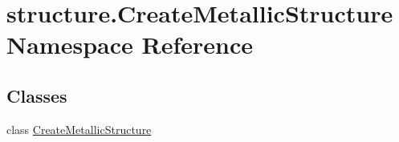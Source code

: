 \hypertarget{namespacestructure_1_1_create_metallic_structure}{\section{structure.\-Create\-Metallic\-Structure Namespace Reference}
\label{namespacestructure_1_1_create_metallic_structure}
}
\subsection*{Classes}
\begin{DoxyCompactItemize}
\item 
class \hyperlink{classstructure_1_1_create_metallic_structure_1_1_create_metallic_structure}{Create\-Metallic\-Structure}
\end{DoxyCompactItemize}
